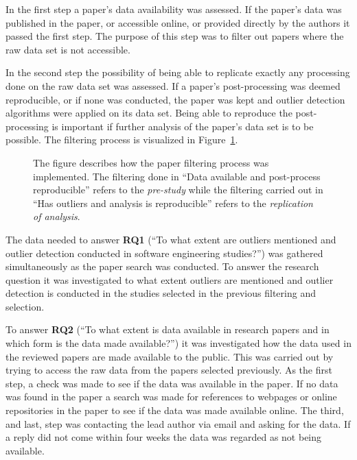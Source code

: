 In the first step a paper's data availability was assessed. If the paper's data was published in the paper, or accessible online, or provided directly by the authors it passed the first step. The purpose of this step was to filter out papers where the raw data set is not accessible. 




In the second step the possibility of being able to replicate exactly any processing done on the raw data set was assessed. If a paper's post-processing was deemed reproducible, or if none was conducted, the paper was kept and outlier detection algorithms were applied on its data set. Being able to reproduce the post-processing is important if further analysis of the paper's data set is to be possible. The filtering process is visualized in Figure~\ref{fig:method-allsteps}.


\begin{figure}
\centering
\caption{The figure describes how the paper filtering process was implemented. The filtering done in ``Data available and post-process reproducible'' refers to the \emph{pre-study} while the filtering carried out in ``Has outliers and analysis is reproducible'' refers to the \emph{replication of analysis}.}
\label{fig:method-allsteps}

\end{figure}




The data needed to answer \textbf{RQ1} (``To what extent are outliers mentioned and outlier detection conducted in software engineering studies?'') was gathered simultaneously as the paper search was conducted. To answer the research question it was investigated to what extent outliers are mentioned and outlier detection is conducted in the studies selected in the previous filtering and selection.




To answer \textbf{RQ2} (``To what extent is data available in research papers and in which form is the data made available?'') it was investigated how the data used in the reviewed papers are made available to the public. This was carried out by trying to access the raw data from the papers selected previously. As the first step, a check was made to see if the data was available in the paper. If no data was found in the paper a search was made for references to webpages or online repositories in the paper to see if the data was made available online. The third, and last, step was contacting the lead author via email and asking for the data. If a reply did not come within four weeks the data was regarded as not being available. 




